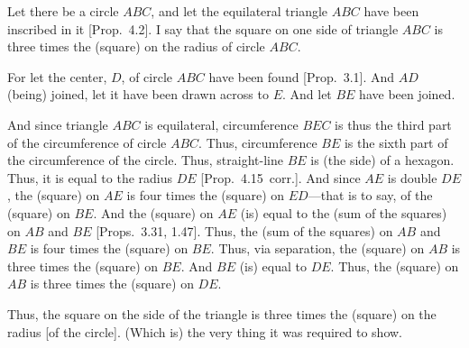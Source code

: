 \begin{Parallel}{}{}
{Let there be a circle $ABC$, and let the equilateral triangle $ABC$ have
been inscribed in it  [Prop.~4.2]. I say that the square on one side of triangle
$ABC$ is three times the (square) on the radius of circle $ABC$. 

\epsfysize=2.5in
\centerline{}

For let the center, $D$, of circle $ABC$ have been found [Prop.~3.1].
And  $AD$ (being) joined, let it have been drawn across to $E$. 
And let $BE$ have been joined.

And since triangle $ABC$ is equilateral, circumference $BEC$ is thus the
third part of the circumference of circle $ABC$. Thus, 
circumference $BE$ is the sixth part of the circumference of the circle. 
Thus, straight-line $BE$ is (the side) of a hexagon. Thus, it is equal to the radius
$DE$ [Prop.~4.15~corr.]. And since $AE$ is double $DE$, the (square)
on $AE$ is four times the (square) on $ED$---that is to say, of the
(square) on $BE$.  And the (square) on $AE$ (is) equal to
the (sum of the squares) on $AB$ and $BE$ [Props.~3.31, 1.47]. 
Thus, the (sum of the squares) on $AB$ and $BE$ is four times the
(square) on $BE$. Thus, via separation, the (square) on $AB$ is three
times the (square) on $BE$. And $BE$ (is) equal to $DE$. Thus, the
(square) on $AB$ is three times the (square) on $DE$.

Thus, the square on the side of the triangle is three times the (square)
on the radius [of the circle]. (Which is) the very thing it was required to show.}
\end{Parallel}

